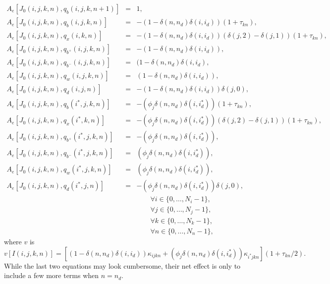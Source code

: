 \documentclass{article}[fleqn,12pt]
\begin{document}
\begin{eqnarray}
        \label{Eq:B2}
        A_e[J_0(i, j, k, n), q_b(i, j, k, n+1)] &=& 1, \nonumber \\
        A_e[J_0(i, j, k, n), q_b(i, j, k, n)] &=& - (1 - \delta(n, n_d)\delta(i, i_d))
                (1 + \tau_{kn}), \nonumber \\
        A_e[J_0(i, j, k, n), q_x(i, k, n)] &=& - (1 - \delta(n, n_d)\delta(i, i_d))
                (\delta(j, 2) - \delta(j, 1))
                (1 + \tau_{kn}), \nonumber \\
        A_e[J_0(i, j, k, n), q_{b^+}(i, j, k, n)] &=& - (1 - \delta(n, n_d)\delta(i, i_d)),
                \nonumber \\
        A_e[J_0(i, j, k, n), q_{b^-}(i, j, k, n)] &=&  (1 - \delta(n, n_d)\delta(i, i_d),
                \nonumber \\
        A_e[J_0(i, j, k, n), q_w(i, j, k, n)] &=& (1 - \delta(n, n_d)\delta(i, i_d)), \nonumber \\
        A_e[J_0(i, j, k, n), q_d(i, j, n)] &=& - (1 - \delta(n, n_d)\delta(i, i_d))
                \delta(j, 0), \nonumber \\
        A_e[J_0(i, j, k, n), q_b(i^*, j, k, n)] &=& - (\phi_j\delta(n, n_d)\delta(i, i^*_d))
                (1 + \tau_{kn}), \nonumber \\
        A_e[J_0(i, j, k, n), q_x(i^*, k, n)] &=& - (\phi_j\delta(n, n_d)\delta(i, i^*_d))
                (\delta(j, 2) - \delta(j, 1))
                (1 + \tau_{kn}), \nonumber \\
        A_e[J_0(i, j, k, n), q_{b^+}(i^*, j, k, n)] &=& - (\phi_j\delta(n, n_d)\delta(i, i^*_d)),
                \nonumber \\
        A_e[J_0(i, j, k, n), q_{b^-}(i^*, j, k, n)] &=& (\phi_j\delta(n, n_d)\delta(i, i^*_d)),
                \nonumber \\
        A_e[J_0(i, j, k, n), q_w(i^*, j, k, n)] &=& (\phi_j\delta(n, n_d)\delta(i, i^*_d)),
                \nonumber \\
        A_e[J_0(i, j, k, n), q_d(i^*, j, n)] &=&  -(\phi_j\delta(n, n_d)\delta(i, i^*_d))
                \delta(j, 0), \nonumber \\
        &&\qquad\forall i \in \{0,\ldots, N_i-1\},\nonumber\\
        &&\qquad\forall j \in \{0,\ldots, N_j-1\},\nonumber\\
        &&\qquad\forall k \in \{0,\ldots, N_k-1\},\nonumber\\
        &&\qquad\forall n \in \{0,\ldots, N_n-1\}, \nonumber
\end{eqnarray}
where $v$ is
\begin{equation}
	v[I(i, j, k, n)] 
	= [(1 - \delta(n, n_d)\delta(i, i_d))
	\kappa_{ijkn} + (\phi_j\delta(n, n_d)\delta(i, i^*_d))\kappa_{i^*jkn}](1 + \tau_{kn}/2). 
\end{equation}
While the last two equations may look cumbersome, their net effect is only to include a few more terms when $n=n_d$. 
\end{document}
